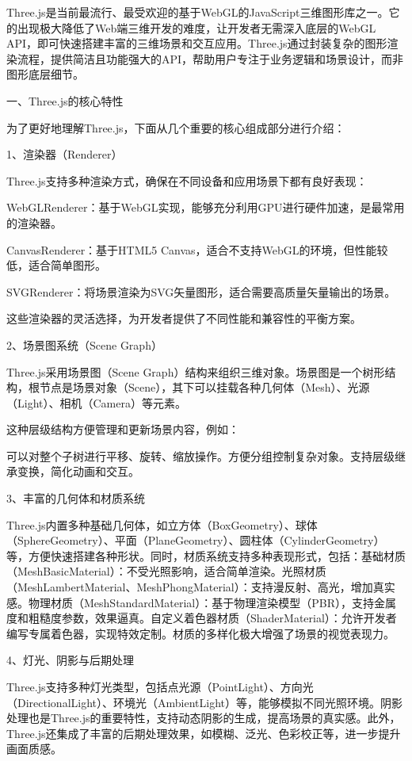 Three.js是当前最流行、最受欢迎的基于WebGL的JavaScript三维图形库之一。它的出现极大降低了Web端三维开发的难度，让开发者无需深入底层的WebGL API，即可快速搭建丰富的三维场景和交互应用。Three.js通过封装复杂的图形渲染流程，提供简洁且功能强大的API，帮助用户专注于业务逻辑和场景设计，而非图形底层细节。

一、Three.js的核心特性

为了更好地理解Three.js，下面从几个重要的核心组成部分进行介绍：

1、渲染器（Renderer）

Three.js支持多种渲染方式，确保在不同设备和应用场景下都有良好表现：

WebGLRenderer：基于WebGL实现，能够充分利用GPU进行硬件加速，是最常用的渲染器。

CanvasRenderer：基于HTML5 Canvas，适合不支持WebGL的环境，但性能较低，适合简单图形。

SVGRenderer：将场景渲染为SVG矢量图形，适合需要高质量矢量输出的场景。

这些渲染器的灵活选择，为开发者提供了不同性能和兼容性的平衡方案。

2、场景图系统（Scene Graph）

Three.js采用场景图（Scene Graph）结构来组织三维对象。场景图是一个树形结构，根节点是场景对象（Scene），其下可以挂载各种几何体（Mesh）、光源（Light）、相机（Camera）等元素。

这种层级结构方便管理和更新场景内容，例如：

可以对整个子树进行平移、旋转、缩放操作。方便分组控制复杂对象。支持层级继承变换，简化动画和交互。

3、丰富的几何体和材质系统

Three.js内置多种基础几何体，如立方体（BoxGeometry）、球体（SphereGeometry）、平面（PlaneGeometry）、圆柱体（CylinderGeometry）等，方便快速搭建各种形状。同时，材质系统支持多种表现形式，包括：基础材质（MeshBasicMaterial）：不受光照影响，适合简单渲染。光照材质（MeshLambertMaterial、MeshPhongMaterial）：支持漫反射、高光，增加真实感。物理材质（MeshStandardMaterial）：基于物理渲染模型（PBR），支持金属度和粗糙度参数，效果逼真。自定义着色器材质（ShaderMaterial）：允许开发者编写专属着色器，实现特效定制。材质的多样化极大增强了场景的视觉表现力。

4、灯光、阴影与后期处理

Three.js支持多种灯光类型，包括点光源（PointLight）、方向光（DirectionalLight）、环境光（AmbientLight）等，能够模拟不同光照环境。阴影处理也是Three.js的重要特性，支持动态阴影的生成，提高场景的真实感。此外，Three.js还集成了丰富的后期处理效果，如模糊、泛光、色彩校正等，进一步提升画面质感。

